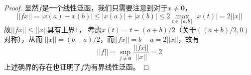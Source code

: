 \documentclass[cn]{homework}
\begin{document}
    \problem
    \begin{proof}
        显然$f$是一个线性泛函，我们只需要注意到对于$x\neq\boldsymbol 0$，
        \[||fx||=|x(a)-x(b)|
        \leq|x(a)|+|x(b)|
        \leq 2\max_{t\in[a,b]}|x(t)|
        =2||x||\]
        故$||fx||\leq ||x||$具有上界1，
        考虑$x(t)=t-(a+b)/2$（关于$((a+b)/2,0)$对称），从而
        $||x||=(b-a)/2$，而$||fx||=b-a=2||x||$，故有
        \[||f||=\sup_{f\neq\boldsymbol 0}\frac{||fx||}{||x||}
        =2\]
        上述确界的存在也证明了$f$为有界线性泛函。
    \end{proof}

    
\end{document}
